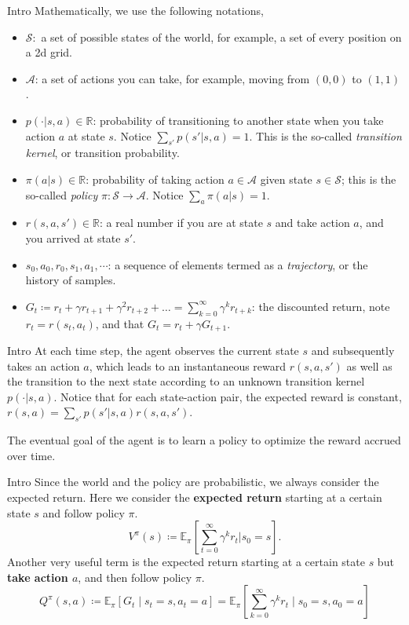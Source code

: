 \documentclass[handout]{beamer}
\begin{document}
\begin{frame}{Intro}
    \small
    Mathematically, we use the following notations,
\begin{itemize}
    \item $\mathcal{S}:$ a set of possible states of the world, for example, a set of every position on a 2d grid.
    \item $\mathcal{A}$: a set of actions you can take, for example, moving from $(0,0)$ to $(1,1)$.
    \item $p(\cdot|s,a) \in \mathbb{R}$: probability of transitioning to another state when you take action $a$ at state $s$. Notice $\sum_{s'} p(s'|s,a)=1$. This is the so-called \textit{transition kernel}, or transition probability. 
    \item $\pi(a|s)\in \mathbb{R}$: probability of taking action $a\in \mathcal{A}$ given state $s\in \mathcal{S}$; this is the so-called \textit{policy} $\pi: \mathcal{S}\rightarrow \mathcal{A}$. Notice $\sum_{a} \pi(a|s) = 1$.
    \item $r(s,a, s')\in \mathbb{R}$: a real number if you are at state $s$ and take action $a$, and you arrived at state $s'$. 
    \item $s_0, a_0, r_0, s_1, a_1,\cdots$: a sequence of elements termed as a \textit{trajectory}, or the history of samples.
    \item $G_t \coloneqq r_t + \gamma r_{t+1} + \gamma^2 r_{t+2} + \dots = \sum_{k=0}^{\infty} \gamma^{k} r_{t+k}$: the discounted return, note $r_t = r(s_t, a_t)$, and that $G_t = r_t + \gamma G_{t+1}$.
\end{itemize}


\end{frame}

\begin{frame}{Intro}
    At each time step, the agent observes the current state $s$ and subsequently takes an action $a$, which leads to an instantaneous reward $r(s, a, s')$ as well as the transition to the next state according to an unknown transition kernel $p(\cdot | s, a)$. Notice that for each state-action pair, the expected reward is constant, $r(s, a) = \sum_{s'} p(s'|s,a) r(s, a, s')$.
    
    The eventual goal of the agent is to learn a policy to optimize the reward accrued over time. 
\end{frame}

\begin{frame}{Intro}
    \small
    Since the world and the policy are probabilistic, we always consider the expected return. Here we consider the \textbf{expected return} starting at a certain state $s$ and follow policy $\pi$. 
    $$V^{\pi}(s) \coloneqq \mathbb{E}_{\pi} \left[ \sum_{t=0}^{\infty} \gamma^k r_{t} | s_0 = s\right].$$ 
    Another very useful term is the expected return starting at a certain state $s$ but \textbf{take action $a$}, and then follow policy $\pi$. 
    $$Q^{\pi}(s, a) \coloneqq \mathbb{E}_{\pi}\left[G_{t} \mid s_{t}=s, a_{t}=a\right]=\mathbb{E}_{\pi}\left[\sum_{k=0}^{\infty} \gamma^{k} r_{t} \mid s_{0}=s, a_{0}=a\right]$$

\end{frame}
\end{document}
